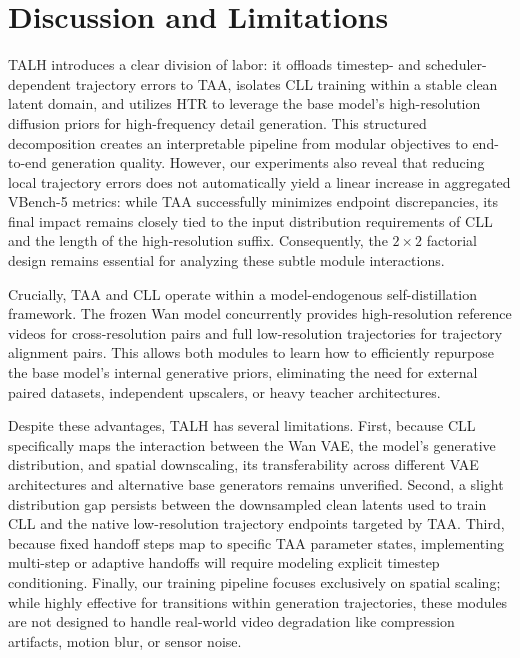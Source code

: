 \section{Discussion and Limitations}

TALH introduces a clear division of labor: it offloads timestep- and
scheduler-dependent trajectory errors to TAA, isolates CLL training
within a stable clean latent domain, and utilizes HTR to leverage the
base model's high-resolution diffusion priors for high-frequency detail
generation. This structured decomposition creates an interpretable
pipeline from modular objectives to end-to-end generation quality.
However, our experiments also reveal that reducing local trajectory
errors does not automatically yield a linear increase in aggregated
VBench-5 metrics: while TAA successfully minimizes endpoint
discrepancies, its final impact remains closely tied to the input
distribution requirements of CLL and the length of the high-resolution
suffix. Consequently, the \(2\times2\) factorial design remains
essential for analyzing these subtle module interactions.

Crucially, TAA and CLL operate within a model-endogenous
self-distillation framework. The frozen Wan model concurrently provides
high-resolution reference videos for cross-resolution pairs and full
low-resolution trajectories for trajectory alignment pairs. This allows
both modules to learn how to efficiently repurpose the base model's
internal generative priors, eliminating the need for external paired
datasets, independent upscalers, or heavy teacher architectures.

Despite these advantages, TALH has several limitations. First, because
CLL specifically maps the interaction between the Wan VAE, the model's
generative distribution, and spatial downscaling, its transferability
across different VAE architectures and alternative base generators
remains unverified. Second, a slight distribution gap persists between
the downsampled clean latents used to train CLL and the native
low-resolution trajectory endpoints targeted by TAA. Third, because
fixed handoff steps map to specific TAA parameter states, implementing
multi-step or adaptive handoffs will require modeling explicit timestep
conditioning. Finally, our training pipeline focuses exclusively on
spatial scaling; while highly effective for transitions within
generation trajectories, these modules are not designed to handle
real-world video degradation like compression artifacts, motion blur, or
sensor noise.

